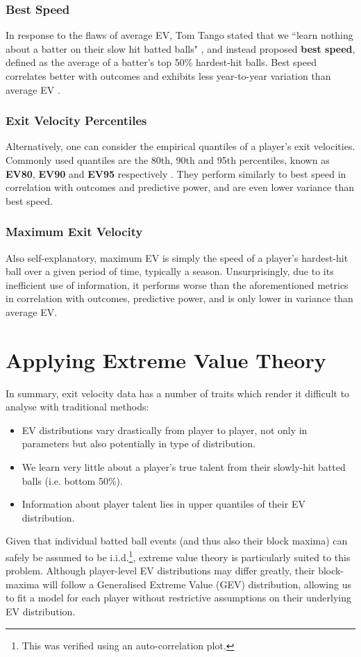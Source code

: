 \documentclass[12pt, TexShade, letterpaper]{report}
\begin{document}
\subsubsection{Best Speed}
In response to the flaws of average EV, Tom Tango stated that we ``learn nothing about a batter on their slow hit batted balls" \cite{tangoBestSpeed}, and instead proposed \textbf{best speed}, defined as the average of a batter's top 50\% hardest-hit balls. Best speed correlates better with outcomes and exhibits less year-to-year variation than average EV \cite{andrewsEV}.

\subsubsection{Exit Velocity Percentiles}
Alternatively, one can consider the empirical quantiles of a player's exit velocities. Commonly used quantiles are the 80th, 90th and 95th percentiles, known as \textbf{EV80}, \textbf{EV90} and \textbf{EV95} respectively \cite{clemensEV}. They perform similarly to best speed in correlation with outcomes and predictive power, and are even lower variance than best speed.

\subsubsection{Maximum Exit Velocity}
Also self-explanatory, maximum EV is simply the speed of a player's hardest-hit ball over a given period of time, typically a season. Unsurprisingly, due to its inefficient use of information, it performs worse than the aforementioned metrics in correlation with outcomes, predictive power, and is only lower in variance than average EV.

\section{Applying Extreme Value Theory}
In summary, exit velocity data has a number of traits which render it difficult to analyse with traditional methods:
\begin{itemize}
    \item EV distributions vary drastically from player to player, not only in parameters but also potentially in type of distribution.
    \item We learn very little about a player's true talent from their slowly-hit batted balls (i.e. bottom 50\%).
    \item Information about player talent lies in upper quantiles of their EV distribution.
\end{itemize}
Given that individual batted ball events (and thus also their block maxima) can safely be assumed to be i.i.d.\footnote{This was verified using an auto-correlation plot.}, extreme value theory is particularly suited to this problem. Although player-level EV distributions may differ greatly, their block-maxima will follow a Generalised Extreme Value (GEV) distribution, allowing us to fit a model for each player without restrictive assumptions on their underlying EV distribution.
\end{document}
